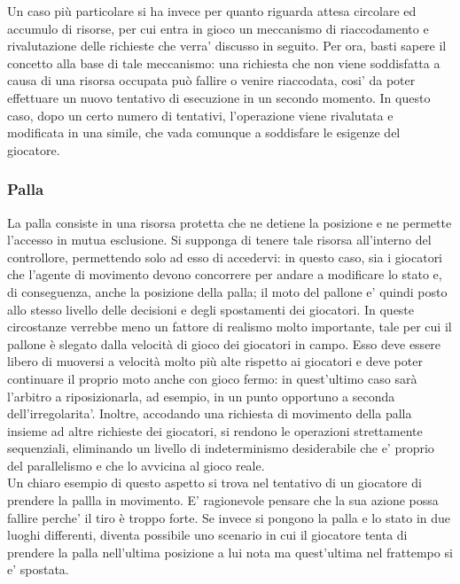 Un caso più particolare si ha invece per quanto riguarda attesa circolare ed accumulo di risorse, per cui entra in gioco un meccanismo di riaccodamento e rivalutazione delle richieste che verra' discusso in seguito. Per ora, basti sapere il concetto alla base di tale meccanismo: una richiesta che non viene soddisfatta a causa di una risorsa occupata può fallire o venire riaccodata, cosi' da poter effettuare un nuovo tentativo di esecuzione in un secondo momento. In questo caso, dopo un certo numero di tentativi, l'operazione viene rivalutata e modificata in una simile, che vada comunque a soddisfare le esigenze del giocatore.

\subsubsection{Palla}
\label{sec:analisi_concorrenza_palla}

La palla consiste in una risorsa protetta che ne detiene la posizione e ne permette l'accesso in mutua esclusione. Si supponga di tenere tale risorsa all'interno del controllore, permettendo solo ad esso di accedervi: in questo caso, sia i giocatori che l'agente di movimento devono concorrere per andare a modificare lo stato e, di conseguenza, anche la posizione della palla; il moto del pallone e' quindi posto allo stesso livello delle decisioni e degli spostamenti dei giocatori. In queste circostanze verrebbe meno un fattore di realismo molto importante, tale per cui il pallone è slegato dalla velocità di gioco dei giocatori in campo. Esso deve essere libero di muoversi a velocità molto più alte rispetto ai giocatori e deve poter continuare il proprio moto anche con gioco fermo: in quest'ultimo caso sarà l'arbitro a riposizionarla, ad esempio, in un punto opportuno a seconda dell'irregolarita'. Inoltre, accodando una richiesta di movimento della palla insieme ad altre richieste dei giocatori, si rendono le operazioni strettamente sequenziali, eliminando un livello di indeterminismo desiderabile che e' proprio del parallelismo e che lo avvicina al gioco reale.\\

Un chiaro esempio di questo aspetto si trova nel tentativo di un giocatore di prendere la pallla in movimento. E' ragionevole pensare che la sua azione possa fallire perche' il tiro è troppo forte. Se invece si pongono la palla e lo stato in due luoghi differenti, diventa possibile uno scenario in cui il giocatore tenta di prendere la palla nell'ultima posizione a lui nota ma quest'ultima nel frattempo si e' spostata.\\

